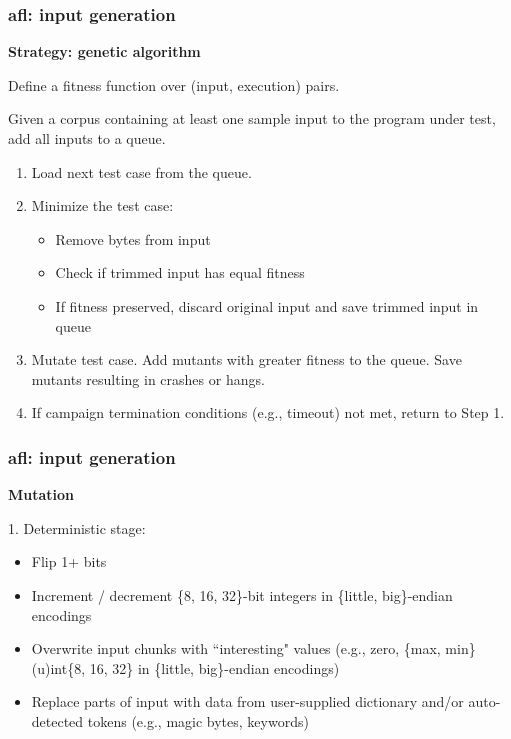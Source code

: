\documentclass{beamer}
\begin{document}
\begin{frame}
	\frametitle{afl: input generation}
	\textbf{Strategy: genetic algorithm}

	\vspace{.5\baselineskip}

	Define a fitness function over (input, execution) pairs. 

	Given a corpus containing at least one sample input to the program under test, add all inputs to a queue.
        \begin{enumerate}
                \item{Load next test case from the queue.}
                \item{Minimize the test case: \begin{itemize}
                                \item{Remove bytes from input}
                                \item{Check if trimmed input has equal fitness}
                                \item{If fitness preserved, discard original input and save trimmed input in queue}
                \end{itemize}}
        \item{Mutate test case. Add mutants with greater fitness to the queue. Save mutants resulting in crashes or hangs.}
        \item{If campaign termination conditions (e.g., timeout) not met, return to Step 1.}

        \end{enumerate}

\end{frame}

\begin{frame}
	\frametitle{afl: input generation}
	\textbf{Mutation}
	
	\vspace{\baselineskip}

	1. Deterministic stage: \begin{itemize}
		\item{Flip 1+ bits}
		\item{Increment / decrement \{8, 16, 32\}-bit integers in \{little, big\}-endian encodings}
		\item{Overwrite input chunks with ``interesting" values (e.g., zero, \{max, min\} (u)int\{8, 16, 32\} in \{little, big\}-endian encodings)}
		\item{Replace parts of input with data from user-supplied dictionary and/or auto-detected tokens (e.g., magic bytes, keywords)}
	\end{itemize}
\end{frame}
\end{document}
